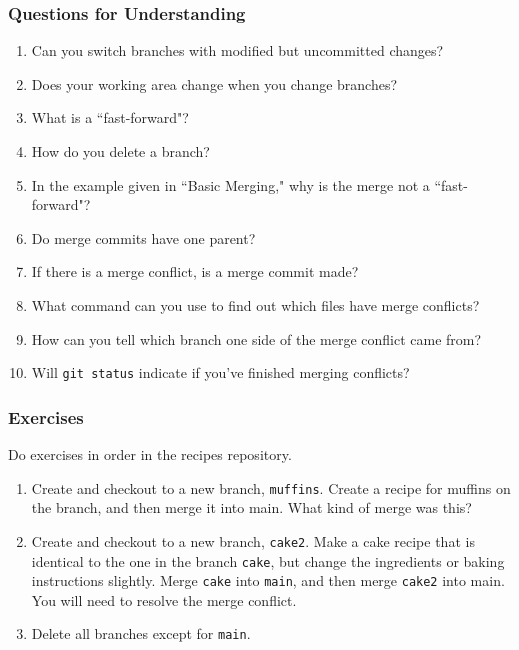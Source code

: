 \subsubsection{Questions for Understanding}
\begin{enumerate}
	\item Can you switch branches with modified but uncommitted changes?
	\item Does your working area change when you change branches?
	\item What is a ``fast-forward"?
	\item How do you delete a branch?
	\item In the example given in ``Basic Merging," why is the merge not a
	   ``fast-forward"?
	\item Do merge commits have one parent?
	\item If there is a merge conflict, is a merge commit made?
	\item What command can you use to find out which files have merge conflicts?
	\item How can you tell which branch one side of the merge conflict came from?
	\item Will \verb`git status` indicate if you've finished merging conflicts?
\end{enumerate}

\subsubsection{Exercises}
Do exercises in order in the recipes repository.
\begin{enumerate}
	\item Create and checkout to a new branch, \verb`muffins`.
	   Create a recipe for muffins on the branch, and then merge it into main.
	   What kind of merge was this?
	\item Create and checkout to a new branch, \verb`cake2`.
	   Make a cake recipe that is identical to the one in the branch \verb`cake`,
	   but change the ingredients or baking instructions slightly.
	   Merge \verb`cake` into \verb`main`, and then merge \verb`cake2` into main.
	   You will need to resolve the merge conflict.
	\item Delete all branches except for \verb`main`.
\end{enumerate}
